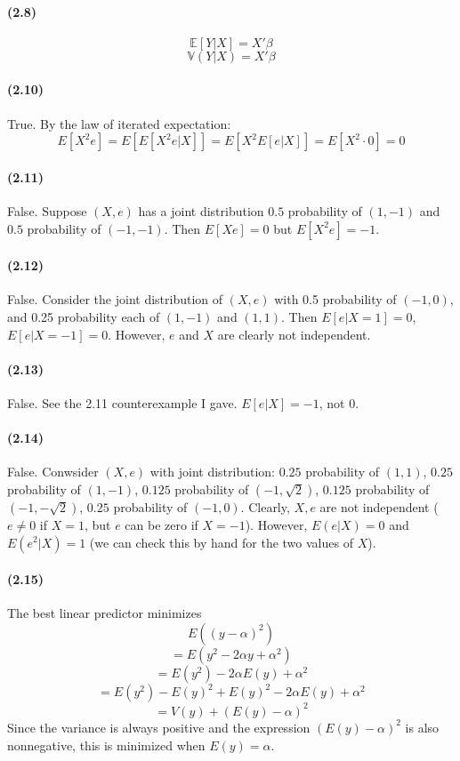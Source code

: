 \documentclass[10pt,letter]{article}
\begin{document}
\paragraph{(2.8)}
\[ \mathbb{E}[Y|X] = X'\beta \]
\[ \mathbb{V}(Y|X) = X'\beta \]

\paragraph{(2.10)} True. By the law of iterated expectation:
\[ E[X^2e] = E[E[X^2e|X]]= E[X^2E[e|X]] = E[X^2 \cdot 0] = 0 \]

\paragraph{(2.11)} False. Suppose $(X,e)$ has a joint distribution $0.5$ probability of $(1,-1)$ and $0.5$ probability of $(-1,  -1)$.  Then $E[Xe] = 0$ but $E[X^2e] = -1$.

\paragraph{(2.12)} False. Consider the joint distribution of $(X,e)$ with 0.5 probability of $(-1, 0)$, and 0.25 probability each of $(1, -1)$ and $(1,  1)$. Then $E[e | X = 1] = 0$, $E[e | X= -1] = 0 $. However, $e$ and $X$ are clearly not independent.

\paragraph{(2.13)} False. See the 2.11 counterexample I gave. $E[e|X] = -1$, not 0.

\paragraph{(2.14)} False. Conwsider $(X,e)$ with joint distribution: $0.25$ probability of $(1,1)$, $0.25$ probability of $(1, -1)$, $0.125$ probability of $(-1, \sqrt{2})$, $0.125$ probability of $(-1, -\sqrt{2})$,  $0.25$ probability of $(-1,  0)$. Clearly,  $X,e$ are not independent ($e \neq 0$ if $X = 1$, but $e$ can be zero if $X = -1$). However, $E(e|X) = 0$ and $E(e^2 |X) = 1$ (we can check  this by hand for the two values of $X$).

\paragraph{(2.15)} The best linear predictor minimizes
\[ E((y - \alpha)^2)\]
\[ = E(y^2 - 2 \alpha y + \alpha^2) \]
\[ = E(y^2) - 2 \alpha E(y) + \alpha^2 \]
\[ = E(y^2) - E(y)^2 + E(y)^2 - 2 \alpha E(y) + \alpha^2 \]
\[ = V(y) + (E(y) - \alpha)^2 \]
Since the variance is always positive and the expression $(E(y) - \alpha)^2$ is also nonnegative, this is minimized when $E(y) = \alpha$.
\end{document}
